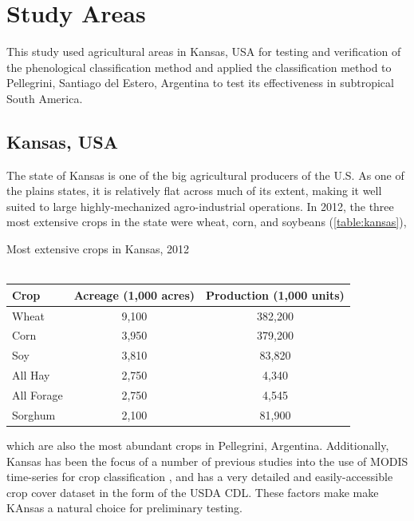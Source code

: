 \chapter{Study Areas}
\label{studyareas}

This study used agricultural areas in Kansas, USA for testing and verification of the phenological classification method and applied the classification method to Pellegrini, Santiago del Estero, Argentina to test its effectiveness in subtropical South America.


\section{Kansas, USA}
\label{studyareas:kansas}

The state of Kansas is one of the big agricultural producers of the U.S. As one of the plains states, it is relatively flat across much of its extent, making it well suited to large highly-mechanized agro-industrial operations. In 2012, the three most extensive crops in the state were wheat, corn, and soybeans (\autoref{table:kansas}),
\begin{sstable}
  \centering
  \caption[Most extensive crops in Kansas, 2012.]{Most extensive crops in Kansas, 2012\\~\autocite[adapted from][]{usda2013kansascrops}}
  \label{table:kansas}
  \begin{tabu}{lcc}
    \toprule
    \textbf{Crop} & \textbf{Acreage (1,000 acres)} & \textbf{Production (1,000 units)} \\
    \midrule
    Wheat & 9,100 & 382,200 \\
    Corn & 3,950 & 379,200 \\
    Soy & 3,810 & 83,820 \\
    All Hay & 2,750 & 4,340 \\
    All Forage & 2,750 & 4,545 \\
    Sorghum & 2,100 & 81,900 \\      
    \bottomrule
  \end{tabu}
\end{sstable}
which are also the most abundant crops in Pellegrini, Argentina. Additionally, Kansas has been the focus of a number of previous studies into the use of MODIS time-series for crop classification \autocites{wardlow2002discriminating}{wardlow2005state-level}{wardlow2007analysis}{wardlow2008large-area}, and has a very detailed and easily-accessible crop cover dataset in the form of the USDA CDL. These factors make make KAnsas a natural choice for preliminary testing.


